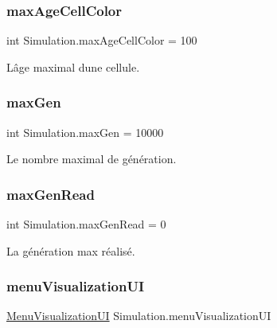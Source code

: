 \subsubsection{\texorpdfstring{max\+Age\+Cell\+Color}{maxAgeCellColor}}
{\footnotesize\ttfamily int Simulation.\+max\+Age\+Cell\+Color = 100\hspace{0.3cm}{\ttfamily [private]}}



L\textquotesingle{}âge maximal d\textquotesingle{}une cellule. 

\mbox{\label{class_simulation_ace7b43c186833b6babd2f131eb705ebb}} 
\subsubsection{\texorpdfstring{max\+Gen}{maxGen}}
{\footnotesize\ttfamily int Simulation.\+max\+Gen = 10000\hspace{0.3cm}{\ttfamily [private]}}



Le nombre maximal de génération. 

\mbox{\label{class_simulation_ad4dd940ecc0d68275e9db930991494ee}} 
\subsubsection{\texorpdfstring{max\+Gen\+Read}{maxGenRead}}
{\footnotesize\ttfamily int Simulation.\+max\+Gen\+Read = 0\hspace{0.3cm}{\ttfamily [private]}}



La génération max réalisé. 

\mbox{\label{class_simulation_affdff461f776f637b6439c04b0984fac}} 
\subsubsection{\texorpdfstring{menu\+Visualization\+UI}{menuVisualizationUI}}
{\footnotesize\ttfamily \mbox{\hyperlink{class_menu_visualization_u_i}{Menu\+Visualization\+UI}} Simulation.\+menu\+Visualization\+UI\hspace{0.3cm}{\ttfamily [private]}}



